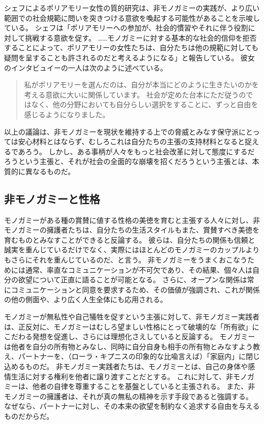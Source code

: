 \documentclass[paper=a4,book,openany]{jlreq} \usepackage{mystyle}
\begin{document}
シェフによるポリアモリー女性の質的研究は、非モノガミーの実践が、より広い範囲での社会規範に問いを突きつける意欲を喚起する可能性があることを示唆している。
シェフは「ポリアモリーへの参加が、社会的慣習やそれに伴う役割に対して挑戦する意欲を促す。
……モノガミーに対する基本的な社会的信仰を拒否することによって、ポリアモリーの女性たちは、自分たちは他の規範に対しても疑問を呈することも許されるのだと考えるようになる」と報告している。
彼女のインタビュイーの一人は次のように述べている。

\begin{quote}
  私がポリアモリーを選んだのは、自分が本当にどのように生きたいのかを考える意欲に大いに関係しています。
社会が定めた台本にただ従うのではなく、他の分野においても自分らしい選択をすることに、ずっと自由を感じるようになりました。
\citep[pp.9--10]{sheff05:_polyam_women_sexual_subjec_power}

\end{quote}

以上の議論は、非モノガミーを現状を維持する上での脅威とみなす保守派にとっては安心材料とはならず、むしろこれは自分たちの主張の支持材料となると捉えるであろう。
しかし、ある事柄が人々をもっと社会改革に対して態度にするだろうという主張と、それが社会の全面的な崩壊を招くだろうという主張とは、本質的に異なるものだ。

\subsection{非モノガミーと性格}

モノガミーがある種の賞賛に値する性格の美徳を育むと主張する人々に対し、非モノガミーの擁護者たちは、自分たちの生活スタイルもまた、賞賛すべき美徳を育むものとみなすことができると反論する。
彼らは、自分たちの関係も信頼と誠実を重んじているだけでなく、実際にはほとんどのモノガミーのカップルよりもさらにそれを重んじているのだ、と言う。
非モノガミーをうまくおこなうためには通常、率直なコミュニケーションが不可欠であり、その結果、個々人は自分の欲望について正直に語ることが可能となる。
さらに、オープンな関係は常にコミュニケーションと同意を要求するため、その価値が強調され、これが関係の他の側面や、より広く人生全体にも応用される。

モノガミーが無私性や自己犠牲を促すという主張に対して、非モノガミー実践者は、正反対に、モノガミーはむしろ望ましい性格にとって破壊的な「所有欲」にこだわる発想を促進し、さらには理想化さえしていると反論する。
モノガミーは他者を自分の所有物とみなし、同時に自分自身も相手の所有物とみなすよう教え、パートナーを、（ローラ・キプニスの印象的な比喩言えば）「家庭内」に閉じ込めるものだ。
非モノガミー実践者たちは、モノガミーとは、自己の身体や感情生活に対する権利を他者に譲り渡すことだとする。
これに対して、非モノガミーは、他者の自律を尊重することを基盤としていると主張される。
また、非モノガミーの擁護者は、それが真の無私の精神を示す手段であると強調する。
なぜなら、パートナーに対し、その本来の欲望を制約なく追求する自由を与えるものだからだ。
\end{document}
